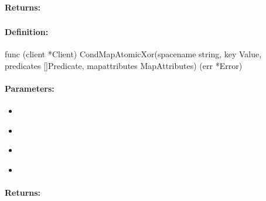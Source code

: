\paragraph{Returns:}


\pagebreak
\subsubsection{}
\label{api:Go:CondMapAtomicXor}


\paragraph{Definition:}
\begin{gocode}
func (client *Client) CondMapAtomicXor(spacename string, key Value, predicates []Predicate, mapattributes MapAttributes) (err *Error)
\end{gocode}

\paragraph{Parameters:}
\begin{itemize}[noitemsep]
\item {}\\

\item {}\\

\item {}\\

\item {}\\

\end{itemize}

\paragraph{Returns:}


\pagebreak
\subsubsection{}
\label{api:Go:GroupMapAtomicXor}


